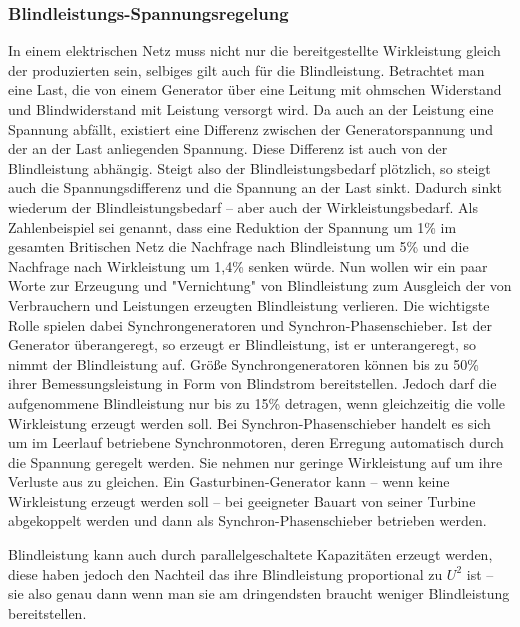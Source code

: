\subsubsection{Blindleistungs-Spannungsregelung}
In einem elektrischen Netz muss nicht nur die bereitgestellte Wirkleistung gleich der produzierten sein, selbiges gilt auch für die Blindleistung.
Betrachtet man eine Last, die von einem Generator über eine Leitung mit ohmschen Widerstand und Blindwiderstand mit Leistung versorgt wird. Da auch an der Leistung eine Spannung abfällt, existiert eine Differenz zwischen der Generatorspannung und der an der Last anliegenden Spannung. Diese Differenz ist auch von der Blindleistung abhängig. Steigt also der Blindleistungsbedarf plötzlich, so steigt auch die Spannungsdifferenz und die Spannung an der Last sinkt. Dadurch sinkt wiederum der Blindleistungsbedarf – aber auch der Wirkleistungsbedarf.
Als Zahlenbeispiel sei genannt, dass eine Reduktion der Spannung um 1\% im gesamten Britischen Netz die Nachfrage nach Blindleistung um 5\% und die Nachfrage nach Wirkleistung um 1,4\% senken würde.
Nun wollen wir ein paar Worte zur Erzeugung und "Vernichtung" von Blindleistung zum Ausgleich der von Verbrauchern und Leistungen erzeugten Blindleistung verlieren. Die wichtigste Rolle spielen dabei Synchrongeneratoren und Synchron-Phasenschieber.
Ist der Generator überangeregt, %
so erzeugt er Blindleistung, ist er unterangeregt, so nimmt der Blindleistung auf. Größe Synchrongeneratoren können bis zu 50\% ihrer Bemessungsleistung in Form von Blindstrom bereitstellen. %
Jedoch darf die aufgenommene Blindleistung nur bis zu 15\% detragen, wenn gleichzeitig die volle Wirkleistung erzeugt werden soll.\cite{Harrison}	%
Bei Synchron-Phasenschieber handelt es sich um im Leerlauf betriebene Synchronmotoren, deren Erregung automatisch durch die Spannung geregelt werden. Sie nehmen nur geringe Wirkleistung auf um ihre Verluste aus zu gleichen. Ein Gasturbinen-Generator kann – wenn keine Wirkleistung erzeugt werden soll – bei geeigneter Bauart von seiner Turbine abgekoppelt werden und dann als Synchron-Phasenschieber betrieben werden.\cite{Harrison}

Blindleistung kann auch durch parallelgeschaltete Kapazitäten erzeugt werden, diese haben jedoch den Nachteil das ihre Blindleistung proportional zu $U^2$ ist – sie also genau dann wenn man sie am dringendsten braucht weniger Blindleistung bereitstellen.\cite{Harrison}

